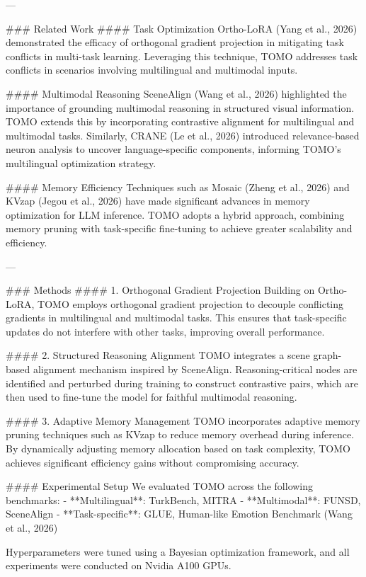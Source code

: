 ---

### Related Work
#### Task Optimization
Ortho-LoRA (Yang et al., 2026) demonstrated the efficacy of orthogonal gradient projection in mitigating task conflicts in multi-task learning. Leveraging this technique, TOMO addresses task conflicts in scenarios involving multilingual and multimodal inputs.

#### Multimodal Reasoning
SceneAlign (Wang et al., 2026) highlighted the importance of grounding multimodal reasoning in structured visual information. TOMO extends this by incorporating contrastive alignment for multilingual and multimodal tasks. Similarly, CRANE (Le et al., 2026) introduced relevance-based neuron analysis to uncover language-specific components, informing TOMO's multilingual optimization strategy.

#### Memory Efficiency
Techniques such as Mosaic (Zheng et al., 2026) and KVzap (Jegou et al., 2026) have made significant advances in memory optimization for LLM inference. TOMO adopts a hybrid approach, combining memory pruning with task-specific fine-tuning to achieve greater scalability and efficiency.

---

### Methods
#### 1. Orthogonal Gradient Projection
Building on Ortho-LoRA, TOMO employs orthogonal gradient projection to decouple conflicting gradients in multilingual and multimodal tasks. This ensures that task-specific updates do not interfere with other tasks, improving overall performance.

#### 2. Structured Reasoning Alignment
TOMO integrates a scene graph-based alignment mechanism inspired by SceneAlign. Reasoning-critical nodes are identified and perturbed during training to construct contrastive pairs, which are then used to fine-tune the model for faithful multimodal reasoning.

#### 3. Adaptive Memory Management
TOMO incorporates adaptive memory pruning techniques such as KVzap to reduce memory overhead during inference. By dynamically adjusting memory allocation based on task complexity, TOMO achieves significant efficiency gains without compromising accuracy.

#### Experimental Setup
We evaluated TOMO across the following benchmarks:
- **Multilingual**: TurkBench, MITRA
- **Multimodal**: FUNSD, SceneAlign
- **Task-specific**: GLUE, Human-like Emotion Benchmark (Wang et al., 2026)

Hyperparameters were tuned using a Bayesian optimization framework, and all experiments were conducted on Nvidia A100 GPUs.

